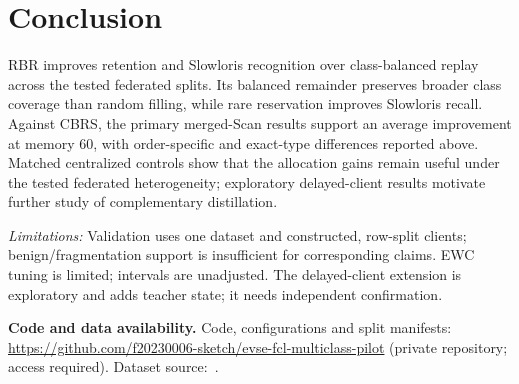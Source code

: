\documentclass[journal,10pt]{IEEEtran}
\begin{document}
\section{Conclusion}
RBR improves retention and Slowloris recognition over class-balanced replay across the tested federated splits. Its balanced remainder preserves broader class coverage than random filling, while rare reservation improves Slowloris recall. Against CBRS, the primary merged-Scan results support an average improvement at memory 60, with order-specific and exact-type differences reported above. Matched centralized controls show that the allocation gains remain useful under the tested federated heterogeneity; exploratory delayed-client results motivate further study of complementary distillation.

\textit{Limitations:} Validation uses one dataset and constructed, row-split clients; benign/fragmentation support is insufficient for corresponding claims. EWC tuning is limited; intervals are unadjusted. The delayed-client extension is exploratory and adds teacher state; it needs independent confirmation.

\noindent\textbf{Code and data availability.} Code, configurations and split manifests: \url{https://github.com/f20230006-sketch/evse-fcl-multiclass-pilot} (private repository; access required). Dataset source:~\cite{dataset}.
\end{document}
